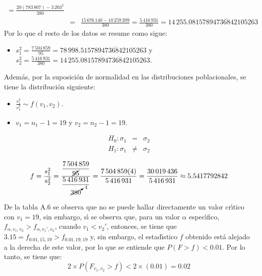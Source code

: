 \begin{solucion}
\begin{datos}
\begin{eqnarray*}
   = \frac{20(783\,807) - 3\,203^2}{380} \\
   & = & \frac{15\,676\,140 - 10\,259\,209}{380}
   = \frac{5\,416\,931}{380} = 14\,255.08\overline{157894736842105263}
  \end{eqnarray*}
  Por lo que el resto de los datos se resume como sigue:
  \begin{itemize}
   \item $s_1^2 = \frac{7\,504\,859}{95}
   = 78\,998.5\overline{157894736842105263}$
   y $s_2^2 = \frac{5\,416\,931}{380}
   = 14\,255.08\overline{157894736842105263}$.
  \end{itemize}
  Adem\'as, por la suposici\'on de normalidad en las distribuciones
  poblacionales, se tiene la distribuci\'on siguiente:
  \begin{itemize}
   \item $\frac{s_1^2}{s_1^2} \sim f(v_1,v_2)$.
   \item $v_1 = n_1 - 1 = 19$ y $v_2 = n_2 - 1 = 19$.
  \end{itemize}
 \end{datos}
 
 \begin{hipotesis}
  \begin{eqnarray*}
   H_0: \sigma_1 &  =   & \sigma_2 \\
   H_1: \sigma_1 & \neq & \sigma_2
  \end{eqnarray*}
 \end{hipotesis}

 \begin{estadistico}
  \begin{equation*}
   f = \frac{s_1^2}{s_2^2}
   = \frac{\displaystyle{\frac{7\,504\,859}{\cancel{95}}}}
   {\displaystyle{\frac{5\,416\,931}{\cancelto{4}{380}}}}
   = \frac{7\,504\,859(4)}{5\,416\,931}
   = \frac{30\,019\,436}{5\,416\,931} \approx 5.5417792842
  \end{equation*}
 \end{estadistico}

 \begin{valorp}
  De la tabla A.6 se observa que no se puede hallar directamente un valor
  cr\'{\i}tico con $v_1=19$, sin embargo, s\'{\i} se observa que,
  para un valor $\alpha$ espec\'{\i}fico,
  $f_{\alpha,v_1,v_2} > f_{\alpha,v_1',v_2}$, cuando $v_1 < v_2'$,
  entonces, se tiene que $3.15 = f_{0.01,15,19} > f_{0.01,19,19}$ y,
  sin embargo, el estad\'{\i}stico $f$ obtenido est\'a alejado a la derecha
  de este valor, por lo que se entiende que $P(F > f) < 0.01$.
  Por lo tanto, se tiene que:
  \begin{equation*}
   2\times P\left( F_{v_1,v_2} > f \right) < 2\times(0.01) = 0.02
  \end{equation*}
 \end{valorp}


\end{solucion}
